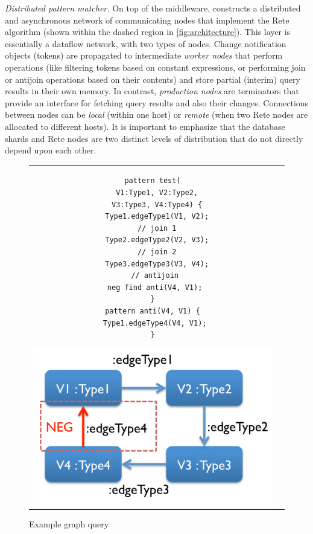 \emph{Distributed pattern matcher.}\label{distributed_pattern_matcher}
On top of the middleware, \iqd{} constructs a distributed and asynchronous network of communicating nodes that implement the Rete~\cite{Forgy} algorithm (shown within the dashed region in \autoref{fig:architecture}). This layer is essentially a dataflow network, with two types of nodes. Change notification objects (tokens) are propagated to intermediate \emph{worker nodes} that perform operations (like filtering tokens based on constant expressions, or performing join or antijoin operations based on their contents) and
store partial (interim) query results in their own memory. In contrast, \emph{production nodes} are terminators that provide an interface for fetching query results and also their changes. Connections between nodes can be \emph{local} (within one host) or \emph{remote} (when two Rete nodes are allocated to different hosts). It is important to emphasize that the database shards and Rete nodes are two distinct levels of distribution that do not directly depend upon each other.

\begin{figure}[!h]
\begin{center}
\begin{tabular}{cc}
\begin{minipage}{0.35\columnwidth}
\begin{lstlisting}
pattern test(
  V1:Type1, V2:Type2,
  V3:Type3, V4:Type4) {
  Type1.edgeType1(V1, V2);
  // join 1
  Type2.edgeType2(V2, V3);
  // join 2
  Type3.edgeType3(V3, V4);
  // antijoin 
  neg find anti(V4, V1); 
}
pattern anti(V4, V1) {
 Type1.edgeType4(V4, V1);
}
\end{lstlisting}
\end{minipage}
\hspace{0.5cm}
\begin{minipage}{0.45\columnwidth}
  \includegraphics[width=\textwidth]{figures/patterndef}
\end{minipage}
\end{tabular}
\end{center}
\caption{Example graph query}
\label{fig:patterndef}
\end{figure}


